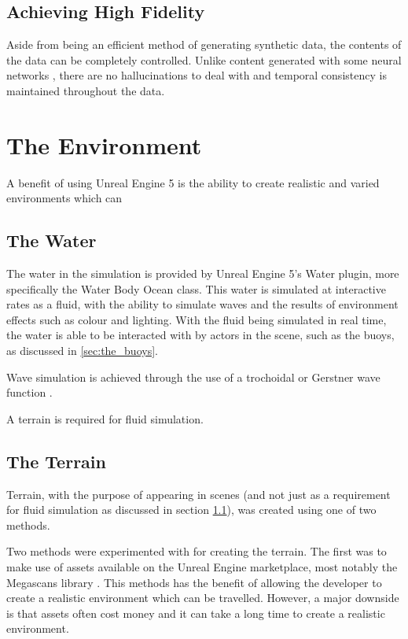 \documentclass[10pt,twocolumn,letterpaper]{article}
\begin{document}
\subsection{Achieving High Fidelity} \label {sec:achieving_high_fidelity}

Aside from being an efficient method of generating synthetic data, the contents of the data can be completely controlled. Unlike content generated with some neural networks \cite{richter2021enhancingphotorealismenhancement}, there are no hallucinations to deal with and temporal consistency is maintained throughout the data.


\section{The Environment}

A benefit of using Unreal Engine 5 is the ability to create realistic and varied environments which can 


\subsection{The Water} \label {sec:the_water}

The water in the simulation is provided by Unreal Engine 5's Water plugin, more specifically the Water Body Ocean class. This water is simulated at interactive rates as a fluid, with the ability to simulate waves and the results of environment effects such as colour and lighting. With the fluid being simulated in real time, the water is able to be interacted with by actors in the scene, such as the buoys, as discussed in \ref{sec:the_buoys}.

Wave simulation is achieved through the use of a trochoidal or Gerstner wave function \cite{constantin2017gerstner}.

A terrain is required for fluid simulation.

\subsection{The Terrain}

Terrain, with the purpose of appearing in scenes (and not just as a requirement for fluid simulation as discussed in section \ref{sec:the_water}), was created using one of two methods.

Two methods were experimented with for creating the terrain. The first was to make use of assets available on the Unreal Engine marketplace, most notably the Megascans library \cite{QuixelMegascans}. This methods has the benefit of allowing the developer to create a realistic environment which can be travelled. However, a major downside is that assets often cost money and it can take a long time to create a realistic environment.
\end{document}
